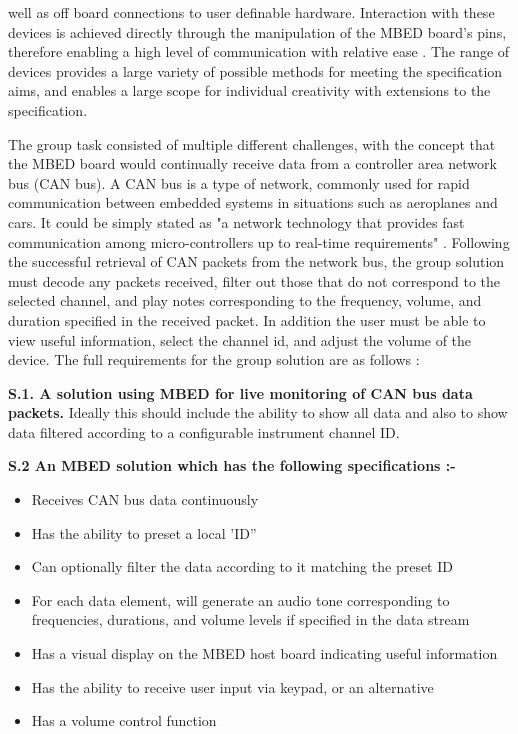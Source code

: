 well as off board connections to user definable hardware. 
Interaction with these devices is achieved directly through the manipulation of 
the MBED board's pins, therefore enabling a high level of communication with 
relative ease \cite{mbed-pins}. 
The range of devices provides a large variety of possible methods for meeting 
the specification aims, and enables a large scope for individual creativity with 
extensions to the specification.
\par\bigskip\noindent
The group task consisted of multiple different challenges, with the concept
that the MBED board would continually receive data from a controller area network
bus (CAN bus). 
A CAN bus is a type of network, commonly used for rapid 
communication between embedded systems in situations such as aeroplanes and cars.
It could be simply stated as "a network technology that provides fast 
communication among micro-controllers up to real-time requirements" 
\cite{voss2005comprehensible}. 
Following the successful retrieval of CAN packets 
from the network bus, the group solution must decode any packets received, 
filter out those that do not correspond to the selected channel, 
and play notes corresponding to the frequency, volume, and duration specified 
in the received packet.
In addition the user must be able to view useful information, select the channel 
id, and adjust the volume of the device. 
The full requirements for the group solution are as follows 
\cite{specification}:
\par\bigskip\noindent
\textbf{S.1. A solution using MBED for live monitoring of CAN bus data packets.}
\hangindent=0.7cm
Ideally this should include the ability to show all data and also 
to show data filtered according to a configurable instrument channel ID.
\par\bigskip\noindent
\textbf{S.2 An MBED solution which has the following specifications :-}
\begin{itemize}
        \item 
            Receives CAN bus data continuously
        \item 
            Has the ability to preset a local 'ID”
        \item 
            Can optionally filter the data according to it matching the preset ID
        \item 
            For each data element, will generate an audio tone corresponding to frequencies,
            durations, and volume levels if specified in the data stream
        \item 
            Has a visual display on the MBED host board indicating useful information
        \item 
            Has the ability to receive user input via keypad, or an alternative
        \item 
            Has a volume control function
\end{itemize}
